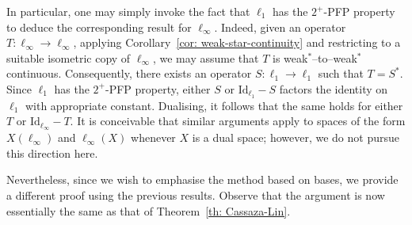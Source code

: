 \documentclass[11pt]{amsart}
\theoremstyle{plain}
\theoremstyle{definition}
\numberwithin{equation}{section}
\newcommand{\Id}{\mathrm{Id}}
\begin{document}
In particular, one may simply invoke the fact that $\ell_1$ has the $2^+$-PFP property to deduce the corresponding result for $\ell_\infty$. Indeed, given an operator $T \colon \ell_\infty \to \ell_\infty$, applying Corollary~\ref{cor: weak-star-continuity} and restricting to a suitable isometric copy of $\ell_\infty$, we may assume that $T$ is weak$^*$–to–weak$^*$ continuous. Consequently, there exists an operator $S \colon \ell_1 \to \ell_1$ such that $T = S^*$. Since $\ell_1$ has the $2^+$-PFP property, either $S$ or $\Id_{\ell_1} - S$ factors the identity on $\ell_1$ with appropriate constant. Dualising, it follows that the same holds for either $T$ or $\Id_{\ell_\infty} - T$. It is conceivable that similar arguments apply to spaces of the form $X(\ell_\infty)$ and $\ell_\infty(X)$ whenever $X$ is a dual space; however, we do not pursue this direction here.

Nevertheless, since we wish to emphasise the method based on bases, we provide a different proof using the previous results. Observe that the argument is now essentially the same as that of Theorem~\ref{th: Cassaza-Lin}.
\end{document}
